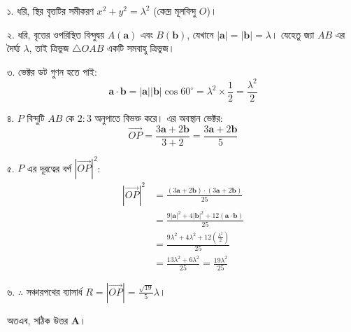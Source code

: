 \documentclass[12pt, a4paper]{article}
\begin{document}
\begin{tcolorbox}[solutionbox={সমাধান (Solution)}]
    \noindent
    ১. ধরি, স্থির বৃত্তটির সমীকরণ $x^2 + y^2 = \lambda^2$ (কেন্দ্র মূলবিন্দু $O$)। 
    
    ২. ধরি, বৃত্তের ওপরিস্থিত বিন্দুদ্বয় $A(\mathbf{a})$ এবং $B(\mathbf{b})$, যেখানে $|\mathbf{a}| = |\mathbf{b}| = \lambda$। 
    যেহেতু জ্যা $AB$ এর দৈর্ঘ্য $\lambda$, তাই ত্রিভুজ $\triangle OAB$ একটি সমবাহু ত্রিভুজ। 
    
    ৩. ভেক্টর ডট গুণন হতে পাই: 
    \[ \mathbf{a} \cdot \mathbf{b} = |\mathbf{a}||\mathbf{b}|\cos 60^{\circ} = \lambda^2 \times \frac{1}{2} = \frac{\lambda^2}{2} \]
    
    ৪. $P$ বিন্দুটি $AB$ কে $2:3$ অনুপাতে বিভক্ত করে। এর অবস্থান ভেক্টর:
    \[ \vec{OP} = \frac{3\mathbf{a} + 2\mathbf{b}}{3 + 2} = \frac{3\mathbf{a} + 2\mathbf{b}}{5} \]
    
    ৫. $P$ এর দূরত্বের বর্গ $|\vec{OP}|^2$:
    \begin{align*}
        |\vec{OP}|^2 &= \frac{(3\mathbf{a} + 2\mathbf{b}) \cdot (3\mathbf{a} + 2\mathbf{b})}{25} \\
        &= \frac{9|\mathbf{a}|^2 + 4|\mathbf{b}|^2 + 12(\mathbf{a} \cdot \mathbf{b})}{25} \\
        &= \frac{9\lambda^2 + 4\lambda^2 + 12\left(\frac{\lambda^2}{2}\right)}{25} \\
        &= \frac{13\lambda^2 + 6\lambda^2}{25} = \frac{19\lambda^2}{25}
    \end{align*}
    
    ৬. $\therefore$ সঞ্চারপথের ব্যাসার্ধ $R = |\vec{OP}| = \frac{\sqrt{19}}{5}\lambda$। 
    
    অতএব, সঠিক উত্তর \textbf{A}।
\end{tcolorbox}
\end{document}
